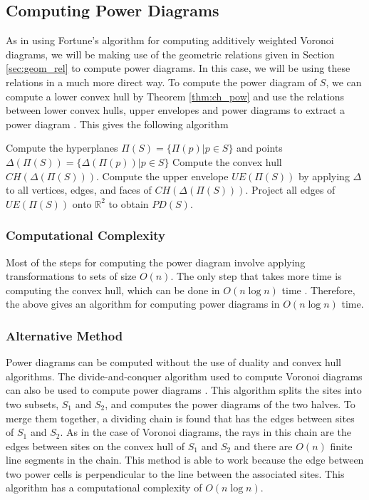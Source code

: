 \documentclass[a4paper, 11pt]{article}
\newcommand{\R}{\mathbb{R}}
\begin{document}
\subsection{Computing Power Diagrams}

As in using Fortune's algorithm for computing additively weighted Voronoi diagrams, we will be making use of the geometric relations given in
Section \ref{sec:geom_rel} to compute power diagrams. In this case, we will be using these relations in a much more direct way. To compute the power
diagram of $S$, we can compute a lower convex hull by Theorem \ref{thm:ch_pow} and use the relations between lower convex hulls, upper envelopes and
power diagrams to extract a power diagram \cite{aurenhammer_power} . This gives the following algorithm

\begin{algorithm}
  \begin{algorithmic}[1]
    \State Compute the hyperplanes $\Pi(S) = \{ \Pi(p) | p \in S \}$ and points $\Delta( \Pi(S) ) = \{ \Delta( \Pi(p) ) | p \in S \}$
    \State Compute the convex hull $CH( \Delta( \Pi(S) ) )$.
    \State Compute the upper envelope $UE( \Pi(S) )$ by applying $\Delta$ to all vertices, edges, and faces of $CH( \Delta( \Pi(S) ) )$.
    \State Project all edges of $UE( \Pi(S) )$ onto $\R^2$ to obtain $PD(S)$.
    \EndFunction
  \end{algorithmic}
\end{algorithm}

\subsubsection{Computational Complexity}

Most of the steps for computing the power diagram involve applying transformations to sets of size $O(n)$. The only step that takes more time is
computing the convex hull, which can be done in $O(n \log n)$ time \cite{comp_geom}. Therefore, the above gives an algorithm for computing power
diagrams in $O(n \log n)$ time.

\subsubsection{Alternative Method}

Power diagrams can be computed without the use of duality and convex hull algorithms. The divide-and-conquer algorithm used to compute Voronoi
diagrams can also be used to compute power diagrams \cite{imai_power}. This algorithm splits the sites into two subsets, $S_1$ and $S_2$, and
computes the power diagrams of the two halves. To
merge them together, a dividing chain is found that has the edges between sites of $S_1$ and $S_2$. As in the case of Voronoi diagrams, the rays
in this chain are the edges between sites on the convex hull of $S_1$ and $S_2$ and there are $O(n)$ finite line segments in the chain. This method
is able to work because the edge between two power cells is perpendicular to the line between the associated sites. This algorithm has a computational
complexity of $O(n \log n)$.
\end{document}

